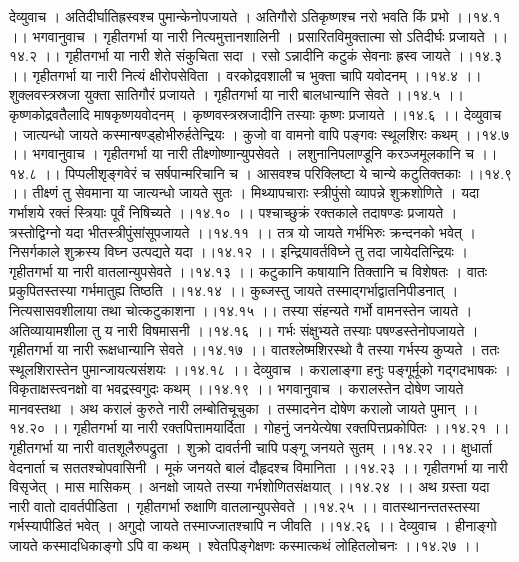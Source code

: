 \documentclass[11pt]{book}
\begin{document}
\begin{landscape}
देव्युवाच ।
अतिदीर्घातिह्रस्वश्च पुमान्केनोपजायते ।
अतिगौरो ऽतिकृष्णश्च नरो भवति किं प्रभो ।।१४.१ ।।
भगवानुवाच ।
गृहीतगर्भा या नारी नित्यमुत्तानशालिनी ।
प्रसारितविमुक्तात्मा सो ऽतिदीर्घः प्रजायते ।।१४.२ ।।
गृहीतगर्भा या नारी शेते संकुचिता सदा ।
रसो ऽन्नादीनि कटुकं सेवनाः ह्रस्व जायते ।।१४.३ ।।
गृहीतगर्भा या नारी नित्यं क्षीरोपसेविता ।
वरकोद्रवशाली च भुक्ता चापि यवोदनम् ।।१४.४ ।।
शुक्लवस्त्रस्रजा युक्ता सातिगौरं प्रजायते ।
गृहीतगर्भा या नारी बालधान्यानि सेवते ।।१४.५ ।।
कृष्णकोद्रवतैलादि माषकृष्णयवोदनम् ।
कृष्णवस्त्रस्रजादीनि तस्याः कृष्णः प्रजायते ।।१४.६ ।।
देव्युवाच ।
जात्यन्धो जायते कस्मान्षण्ड्होभीरुर्हतेन्द्रियः ।
कुजो वा वामनो वापि पङ्गवः स्थूलशिरः कथम् ।।१४.७ ।।
भगवानुवाच ।
गृहीतगर्भा या नारी तीक्ष्णोष्णान्युपसेवते ।
लशुनानिपलाण्डूनि करञ्जमूलकानि च ।।१४.८ ।।
पिप्पलीशृङ्गवेरं च सर्षपान्मरिचानि च ।
आसवश्च परिक्लिष्टा ये चान्ये कटुतिक्तकाः ।।१४.९ ।।
तीक्ष्णं तु सेवमाना या जात्यन्धो जायते सुतः ।
मिथ्यापचाराः स्त्रीपुंसो व्यापन्ने शुक्रशोणिते ।
यदा गर्भाशये रक्तं स्त्रियाः पूर्वं निषिच्यते ।।१४.१० ।।
पश्चाच्छुक्रं रक्तकाले तदाषण्डः प्रजायते ।
त्रस्तोद्विग्नो यदा भीतस्त्रीपुंसांसूपजायते ।।१४.११ ।।
तत्र यो जायते गर्भभिरुः क्रन्दनको भवेत् ।
निसर्गकाले शुक्रस्य विघ्न उत्पद्यते यदा ।।१४.१२ ।।
इन्द्रियावर्तविघ्ने तु तदा जायेदतिन्द्रियः । 
गृहीतगर्भा या नारी वातलान्युपसेवते ।।१४.१३ ।।
कटुकानि कषायानि तिक्तानि च विशेषतः ।
वातः प्रकुपितस्तस्या गर्भमातुह्य तिष्ठति ।।१४.१४ ।।
कुब्जस्तु जायते तस्माद्गर्भाद्वातनिपीडनात् ।
नित्यसासवशीलाया तथा चोत्कटुकाशना ।।१४.१५ ।।
तस्या संहन्यते गर्भो वामनस्तेन जायते ।
अतिव्यायामशीला तु य नारी विषमासनी ।।१४.१६ ।।
गर्भः संक्षुभ्यते तस्याः पषण्डस्तेनोपजायते ।
गृहीतगर्भा या नारी रूक्षधान्यानि सेवते ।।१४.१७ ।।
वातश्लेष्मशिरस्थो वै तस्या गर्भस्य कुप्यते ।
ततः स्थूलशिरास्तेन पुमान्जायत्यसंशयः ।।१४.१८ ।।
देव्युवाच ।
करालाङ्गा हनुः पङ्गूर्मूको गद्गदभाषकः ।
विकृताक्षस्त्वनक्षो वा भवद्रस्वगुदः कथम् ।।१४.१९ ।।
भगवानुवाच ।
करालस्तेन दोषेण जायते मानवस्तथा ।
अथ करालं कुरुते नारी लम्बोतिचूचुका ।
तस्मादनेन दोषेण करालो जायते पुमान् ।।१४.२० ।।
गृहीतगर्भा या नारी रक्तपित्तामयार्दिता ।
गोहनुं जनयेत्येषा रक्तपित्तप्रकोपितः ।।१४.२१ ।।
गृहीतगर्भा या नारी वातशूलैरुपद्रुता ।
शुक्रो दावर्तनी चापि पङ्गू जनयते सुतम् ।।१४.२२ ।।
क्षुधार्ता वेदनार्ता च सततश्चोपवासिनी ।
मूकं जनयते बालं दौहृदश्च विमानिता ।।१४.२३ ।।
गृहीतगर्भा या नारी विसृजेत्  । मास मासिकम् ।
अनक्षो जायते तस्या गर्भशोणितसंक्षयात् ।।१४.२४ ।।
अथ ग्रस्ता यदा नारी वातो दावर्तपीडिता ।
गृहीतगर्भा रुक्षाणि वातलान्युपसेवते ।।१४.२५ ।।
वातस्थानन्ततस्तस्या गर्भस्यापीडितं भवेत् ।
अगुदो जायते तस्माज्जातश्चापि न जीवति ।।१४.२६ ।।
देव्युवाच ।
हीनाङ्गो जायते कस्मादधिकाङ्गो ऽपि वा कथम् ।
श्वेतपिङ्गेक्षणः कस्मात्कथं लोहितलोचनः ।।१४.२७ ।।

\end{landscape}
\end{document}

